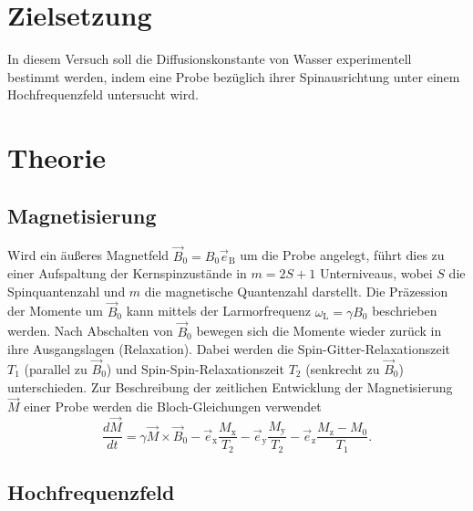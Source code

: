 \section{Zielsetzung}
\label{sec:Zielsetzung}

In diesem Versuch soll die Diffusionskonstante von Wasser experimentell bestimmt werden,
indem eine Probe bezüglich ihrer Spinausrichtung unter einem Hochfrequenzfeld untersucht
wird. 

\section{Theorie}
\label{sec:Theorie}

\subsection{Magnetisierung}
\label{sec:Magnetisierung}

Wird ein äußeres Magnetfeld $\vec{B}_{\text{0}} = B_{\text{0}} \vec{e}_{\text{B}}$
um die Probe angelegt, führt dies zu einer
Aufspaltung der Kernspinzustände in $m = 2S+1$ Unterniveaus, wobei $S$ die Spinquantenzahl
und $m$ die magnetische Quantenzahl darstellt. 
Die Präzession der Momente um $\vec{B}_{\text{0}}$ kann mittels der Larmorfrequenz 
$\omega_{\text{L}}= \gamma B_{\text{0}}$
beschrieben werden.
Nach Abschalten von $\vec{B}_{\text{0}}$ bewegen sich die Momente wieder zurück in 
ihre Ausgangslagen (Relaxation). 
Dabei werden die Spin-Gitter-Relaxationszeit $T_{\text{1}}$ 
(parallel zu $\vec{B}_{\text{0}}$) und Spin-Spin-Relaxationszeit $T_{\text{2}}$
(senkrecht zu $\vec{B}_{\text{0}}$) unterschieden.
Zur Beschreibung der zeitlichen Entwicklung der Magnetisierung $\vec{M}$ einer Probe 
werden die Bloch-Gleichungen verwendet 
\begin{equation}
    \frac{d \vec{M}}{dt} 
    = \gamma \vec{M} \times \vec{B}_{\text{0}} 
    - \vec{e}_{\text{x}} \frac{M_{\text{x}}}{T_{\text{2}}} 
    - \vec{e}_{\text{y}} \frac{M_{\text{y}}}{T_{\text{2}}} 
    - \vec{e}_{\text{z}} \frac{M_{\text{z}}-M_{\text{0}}}{T_{\text{1}}}.
  \label{eq3}
\end{equation}

\subsection{Hochfrequenzfeld}
\label{sec:Hochfrequenzfeld}

